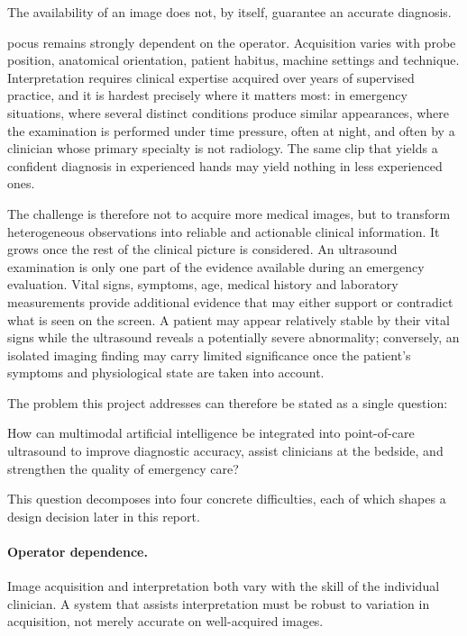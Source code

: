 \begin{keystatement}
The availability of an image does not, by itself, guarantee an accurate diagnosis.
\end{keystatement}

\gls{pocus} remains strongly dependent on the operator. Acquisition varies with probe
position, anatomical orientation, patient habitus, machine settings and technique.
Interpretation requires clinical expertise acquired over years of supervised practice, and
it is hardest precisely where it matters most: in emergency situations, where several
distinct conditions produce similar appearances, where the examination is performed under
time pressure, often at night, and often by a clinician whose primary specialty is not
radiology. The same clip that yields a confident diagnosis in experienced hands may yield
nothing in less experienced ones.

The challenge is therefore not to acquire more medical images, but to transform
heterogeneous observations into reliable and actionable clinical information. It grows
once the rest of the clinical picture is considered. An ultrasound examination is only one
part of the evidence available during an emergency evaluation. Vital signs, symptoms, age,
medical history and laboratory measurements provide additional evidence that may either
support or contradict what is seen on the screen. A patient may appear relatively stable
by their vital signs while the ultrasound reveals a potentially severe abnormality;
conversely, an isolated imaging finding may carry limited significance once the patient's
symptoms and physiological state are taken into account.

The problem this project addresses can therefore be stated as a single question:

\begin{keystatement}
How can multimodal artificial intelligence be integrated into point-of-care ultrasound to
improve diagnostic accuracy, assist clinicians at the bedside, and strengthen the quality
of emergency care?
\end{keystatement}

This question decomposes into four concrete difficulties, each of which shapes a design
decision later in this report.

\paragraph{Operator dependence.} Image acquisition and interpretation both vary with the
skill of the individual clinician. A system that assists interpretation must be robust to
variation in acquisition, not merely accurate on well-acquired images.

